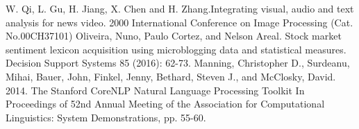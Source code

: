 \documentclass[conference]{IEEEtran}
\begin{document}
\begin{thebibliography}{00}
 W. Qi, L. Gu, H. Jiang, X. Chen and H. Zhang.Integrating visual, audio and text analysis for news video. 2000 International Conference on Image Processing (Cat. No.00CH37101)
Oliveira, Nuno, Paulo Cortez, and Nelson Areal. Stock market sentiment lexicon acquisition using microblogging data and statistical measures. Decision Support Systems 85 (2016): 62-73.
 Manning, Christopher D., Surdeanu, Mihai, Bauer, John, Finkel, Jenny, Bethard, Steven J., and McClosky, David. 2014. The Stanford CoreNLP Natural Language Processing Toolkit In Proceedings of 52nd Annual Meeting of the Association for Computational Linguistics: System Demonstrations, pp. 55-60.

\end{thebibliography}
\end{document}
